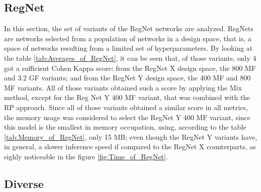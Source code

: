 \pagebreak

\subsection{RegNet}







In this section, the set of variants of the RegNet networks are analyzed. RegNets are networks selected from a population of networks in a design space, that is, a space of networks resulting from a limited set of hyperparameters. By looking at the table \ref{tab:Averages_of_RegNet}, it can be seen that, of those variants, only 4 got a sufficient Cohen Kappa score: from the RegNet X design space, the 800 MF and 3.2 GF variants; and from the RegNet Y design space, the 400 MF and 800 MF variants. All of those variants obtained such a score by applying the \acrshort{Mix} method, except for the Reg Net Y 400 MF variant, that was combined with the \acrshort{RP} approach. Since all of those variants obtained a similar score in all metrics, the memory usage was considered to select the RegNet Y 400 MF variant, since this model is the smallest in memory occupation, using, according to the table \ref{tab:Memory_of_RegNet}, only 15 MB; even though the RegNet Y variants have, in general, a slower inference speed if compared to the RegNet X counterparts, as sighly noticeable in the figure \ref{fig:Time_of_RegNet}.

\subsection{Diverse}

%

